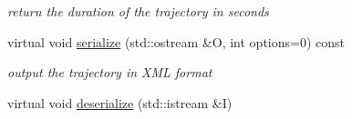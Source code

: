 \begin{DoxyCompactItemize}
\begin{DoxyCompactList}\small\item\em return the duration of the trajectory in seconds \item\end{DoxyCompactList}\item 
\hypertarget{classOpenRAVE_1_1TrajectoryBase_adfa364ca828b73e2e46ebe94c16ab492}{
virtual void \hyperlink{classOpenRAVE_1_1TrajectoryBase_adfa364ca828b73e2e46ebe94c16ab492}{serialize} (std::ostream \&O, int options=0) const }
\label{classOpenRAVE_1_1TrajectoryBase_adfa364ca828b73e2e46ebe94c16ab492}

\begin{DoxyCompactList}\small\item\em output the trajectory in XML format \item\end{DoxyCompactList}\item 
\hypertarget{classOpenRAVE_1_1TrajectoryBase_adaeacd32f1a27831c97032e1e6b24944}{
virtual void \hyperlink{classOpenRAVE_1_1TrajectoryBase_adaeacd32f1a27831c97032e1e6b24944}{deserialize} (std::istream \&I)}
\label{classOpenRAVE_1_1TrajectoryBase_adaeacd32f1a27831c97032e1e6b24944}


\end{DoxyCompactItemize}
